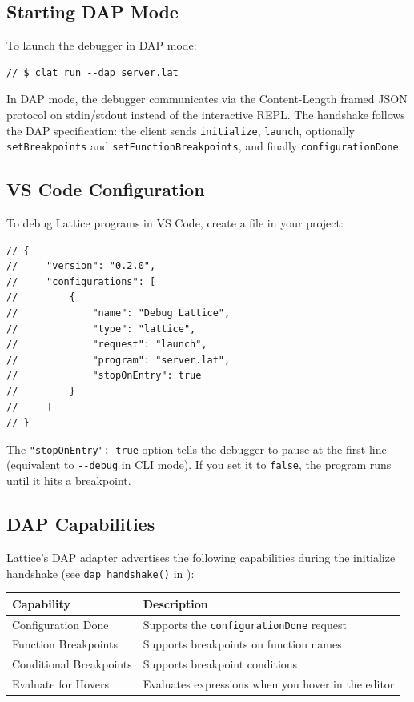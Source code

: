 \subsection{Starting DAP Mode}\label{sec:dap-start}

To launch the debugger in DAP mode:

\begin{lstlisting}[language=Lattice, caption={Launching DAP mode}]
// $ clat run --dap server.lat
\end{lstlisting}

In DAP mode, the debugger communicates via the Content-Length framed JSON protocol on stdin/stdout instead of the interactive REPL.
The handshake follows the DAP specification: the client sends \lstinline|initialize|, \lstinline|launch|, optionally \lstinline|setBreakpoints| and \lstinline|setFunctionBreakpoints|, and finally \lstinline|configurationDone|.

\subsection{VS Code Configuration}\label{sec:vscode-config}

To debug Lattice programs in VS Code, create a  file in your project:

\begin{lstlisting}[language=Lattice, caption={VS Code launch.json for Lattice debugging}]
// {
//     "version": "0.2.0",
//     "configurations": [
//         {
//             "name": "Debug Lattice",
//             "type": "lattice",
//             "request": "launch",
//             "program": "server.lat",
//             "stopOnEntry": true
//         }
//     ]
// }
\end{lstlisting}

The \lstinline|"stopOnEntry": true| option tells the debugger to pause at the first line (equivalent to \lstinline|--debug| in CLI mode).
If you set it to \lstinline|false|, the program runs until it hits a breakpoint.

\subsection{DAP Capabilities}\label{sec:dap-capabilities}

Lattice's DAP adapter advertises the following capabilities during the initialize handshake (see \lstinline|dap_handshake()| in ):

\begin{longtable}{@{}lp{8cm}@{}}
\toprule
\textbf{Capability} & \textbf{Description} \\
\midrule
\endhead
Configuration Done & Supports the \lstinline|configurationDone| request \\
Function Breakpoints & Supports breakpoints on function names \\
Conditional Breakpoints & Supports breakpoint conditions \\
Evaluate for Hovers & Evaluates expressions when you hover in the editor \\
\bottomrule
\end{longtable}

